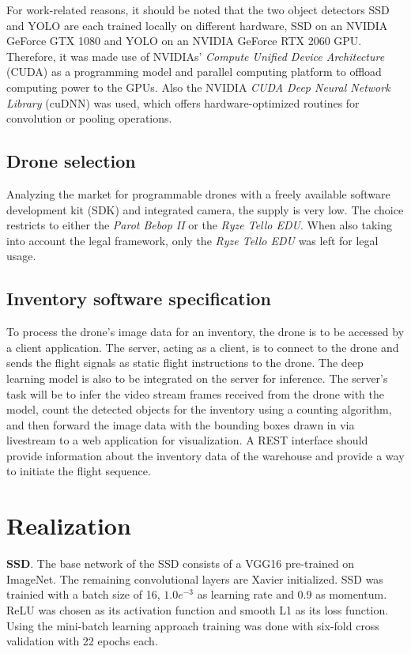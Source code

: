 \documentclass[a4paper, 10pt, journal]{wissarbIEEE}      %
\begin{document}
For work-related reasons, it should be noted that the two object detectors SSD and YOLO are each trained locally on different hardware, SSD on an NVIDIA GeForce GTX 1080 and YOLO on an NVIDIA GeForce RTX 2060 GPU. Therefore, it was made use of NVIDIAs' \textit{Compute Unified Device Architecture} (CUDA) as a programming model and parallel computing platform to offload computing power to the GPUs. Also the NVIDIA \textit{CUDA Deep Neural Network Library} (cuDNN) was used, which offers hardware-optimized routines for convolution or pooling operations. 

\subsection{Drone selection}

Analyzing the market for programmable drones with a freely available software development kit (SDK) and integrated camera, the supply is very low. The choice restricts to either the \textit{Parot Bebop II} or the \textit{Ryze Tello EDU}. When also taking into account the legal framework, only the \textit{Ryze Tello EDU} was left for legal usage.

\subsection{Inventory software specification}

To process the drone's image data for an inventory, the drone is to be accessed by a client application. The server, acting as a client, is to connect to the drone and sends the flight signals as static flight instructions to the drone. The deep learning model is also to be integrated on the server for inference. The server's task will be to infer the video stream frames received from the drone with the model, count the detected objects for the inventory using a counting algorithm, and then forward the image data with the bounding boxes drawn in via livestream to a web application for visualization. A REST interface should provide information about the inventory data of the warehouse and provide a way to initiate the flight sequence.

\section{Realization} \label{realization}

\textbf{SSD}. The base network of the SSD consists of a VGG16 pre-trained on ImageNet. The remaining convolutional layers are Xavier initialized. SSD was trainied with a batch size of 16, $1.0e^{-3}$ as learning rate and 0.9 as momentum. ReLU was chosen as its activation function and smooth L1 as its loss function. Using the mini-batch learning approach training was done with six-fold cross validation with 22 epochs each.
\end{document}
